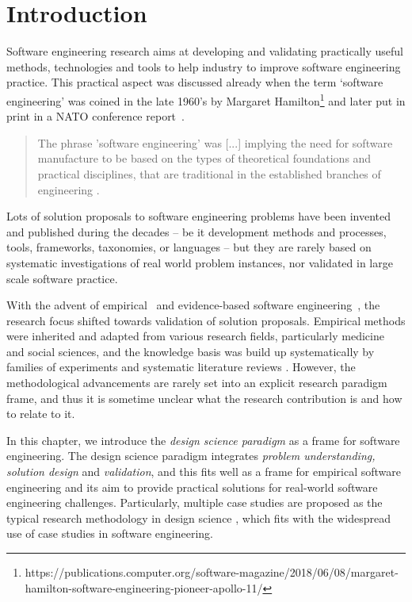 \documentclass[graybox]{svmult}
\begin{document}
\section{Introduction}
\label{sec:intro}


Software engineering research aims at developing and validating practically useful methods, technologies and tools to help industry to improve software engineering practice. This practical aspect was discussed already when the term `software engineering' was coined in the late 1960's by Margaret Hamilton\footnote{https://publications.computer.org/software-magazine/2018/06/08/margaret-hamilton-software-engineering-pioneer-apollo-11/} and later put in print in a NATO conference report~\cite{Nato1968}. 

\begin{quote}
{The phrase 'software engineering' was [...] implying the need for software manufacture to be based on the types of theoretical foundations and practical disciplines, that are traditional in the established branches of engineering} \cite[p13]{Nato1968}. 
\end{quote}

Lots of solution proposals to software engineering problems have been invented and published during the decades -- be it development methods and processes, tools, frameworks, taxonomies, or languages -- but they are rarely based on systematic investigations of real world problem instances, nor validated in large scale software practice.

With the advent of empirical~\cite{Basili86} and evidence-based software engineering~\cite{Kitchenham04}, the research focus shifted towards validation of solution proposals. Empirical methods were inherited and adapted from various research fields, particularly medicine and social sciences, and the knowledge basis was build up systematically by families of experiments \cite{Basili99} and systematic literature reviews \cite{Kitchenham15}. However, the methodological advancements are rarely set into an explicit research paradigm frame, and thus it is sometime unclear what the research contribution is and how to relate to it. 

In this chapter, we introduce the \emph{design science paradigm} as a frame for software engineering. The design science paradigm integrates \emph{problem understanding, solution design} and \emph{validation}, and this fits well as a frame for empirical software engineering and its aim to provide practical solutions for real-world software engineering challenges. Particularly, multiple case studies are proposed as the typical research methodology in design science \cite{van_aken_management_2004}, which fits with the widespread use of case studies in software engineering.
\end{document}
